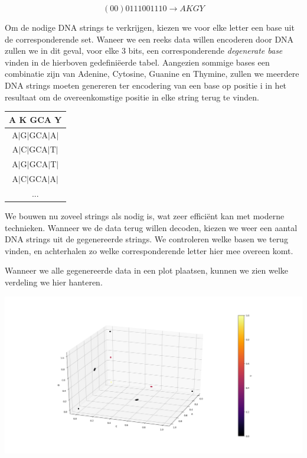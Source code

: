 \documentclass{esannV2}
\begin{document}
$$(00)0111001110 \rightarrow AKGY$$

Om de nodige DNA strings te verkrijgen, kiezen we voor elke letter een base uit de corresponderende set.
Waneer we een reeks data willen encoderen door DNA zullen we in dit geval, voor elke 3 bits, een corresponderende \textit{degenerate base} vinden in de hierboven gedefini\"eerde tabel. Aangezien sommige bases een combinatie zijn van Adenine, Cytosine, Guanine en Thymine, zullen we meerdere DNA strings moeten genereren ter encodering van een base op positie i in het resultaat om de overeenkomstige positie in elke string terug te vinden.
\newline
\begin{center}
\begin{tabular}{c}
	A K GCA Y \\
	\hline
	A$|$G$|$GCA$|$A$|$\\
	A$|$C$|$GCA$|$T$|$\\
	A$|$G$|$GCA$|$T$|$\\
	A$|$C$|$GCA$|$A$|$\\
	...\\
\end{tabular}
\end{center}
\newpage

We bouwen nu zoveel strings als nodig is, wat zeer effici\"ent kan met moderne technieken.
Wanneer we de data terug willen decoden, kiezen we weer een aantal DNA strings uit de gegenereerde strings.
We controleren welke basen we terug vinden, en achterhalen zo welke corresponderende letter hier mee overeen komt.
\newline

Wanneer we alle gegenereerde data in een plot plaatsen, kunnen we zien welke verdeling we hier hanteren.

\includegraphics[scale=0.35]{img/practical.png}
\end{document}
